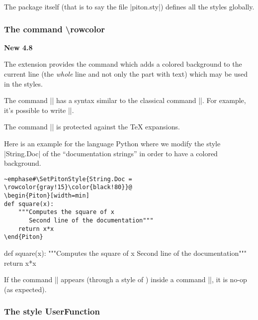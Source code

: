 \documentclass{article}
\begin{document}
\bigskip
The package  itself (that is to say the file |piton.sty|) defines
all the styles globally. 

\bigskip

\bigskip
\subsubsection{The command \textbackslash rowcolor}

\label{rowcolor}

\colorbox{yellow!50}{\textbf{New 4.8}}

\nobreak
\medskip
The extension  provides the command  which adds
a colored background to the current line (the \emph{whole} line and not only the part with
text) which may be used in the styles.

\smallskip
The command |\rowcolor| has a syntax similar to the classical command |\color|. For example,
it's possible to write ||.

\smallskip
The command |\rowcolor| is protected against the TeX expansions.

\smallskip
Here is an example for the language Python where we modify the style |String.Doc|
of the ``documentation strings'' in order to have a colored background.


\begin{Verbatim}
~emphase#\SetPitonStyle{String.Doc = \rowcolor{gray!15}\color{black!80}}@
\begin{Piton}[width=min]
def square(x):
    """Computes the square of x
       Second line of the documentation"""
    return x*x
\end{Piton}
\end{Verbatim}


\bigskip
\begingroup
{}
\begin{Piton}[width=min]
def square(x):
    """Computes the square of x
       Second line of the documentation"""
    return x*x
\end{Piton}
\endgroup


\bigskip
If the command |\rowcolor| appears (through a style of ) inside a
command |\piton|, it is no-op (as expected).


\subsubsection{The style UserFunction}
\end{document}

